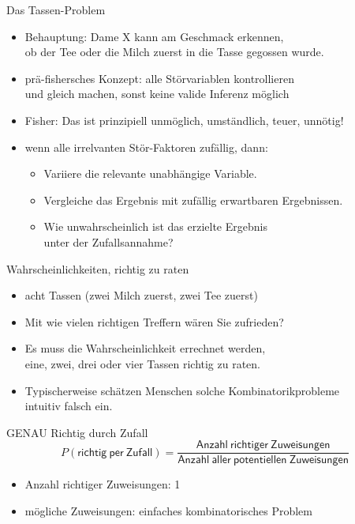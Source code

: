 \begin{frame}
  {Das Tassen-Problem}
  \begin{itemize}[<+->]
    \item Behauptung: Dame X kann am Geschmack erkennen,\\
      ob der Tee oder die Milch zuerst in die Tasse gegossen wurde.
    \item prä-fishersches Konzept: \alert{alle Störvariablen kontrollieren}\\
      und gleich machen, sonst keine valide Inferenz möglich
    \item Fisher: Das ist prinzipiell unmöglich, umständlich, teuer, \alert{unnötig}!
    \item wenn alle irrelvanten Stör-Faktoren zufällig, dann:
      \begin{itemize}[<+->]
	\item Variiere die relevante unabhängige Variable.
	\item Vergleiche das Ergebnis mit zufällig erwartbaren Ergebnissen.
	\item \alert{Wie unwahrscheinlich ist das erzielte Ergebnis\\
	  unter der Zufallsannahme?}
      \end{itemize}
  \end{itemize}
\end{frame}

\begin{frame}
  {Wahrscheinlichkeiten, richtig zu raten}
  \begin{itemize}[<+->]
    \item acht Tassen (zwei Milch zuerst, zwei Tee zuerst)
    \item \alert{Mit wie vielen richtigen Treffern wären Sie zufrieden?}
      \pause
      \pause
    \item Es muss die Wahrscheinlichkeit errechnet werden,\\
      eine, zwei, drei oder vier Tassen richtig zu raten.
      \Zeile
    \item \alert{Typischerweise schätzen Menschen solche Kombinatorikprobleme\\
      intuitiv falsch ein.}
  \end{itemize}
\end{frame}

\begin{frame}
  {GENAU Richtig durch Zufall}
  \begin{equation}
    P(\mathsf{richtig\ per\ Zufall})=\frac{\mathsf{Anzahl\ richtiger\ Zuweisungen}}{\mathsf{Anzahl\ aller\ potentiellen\ Zuweisungen}}
  \end{equation}
  \pause
  \begin{itemize}[<+->]
    \item Anzahl richtiger Zuweisungen: 1
    \item mögliche Zuweisungen: einfaches kombinatorisches Problem
  \end{itemize}
\end{frame}

